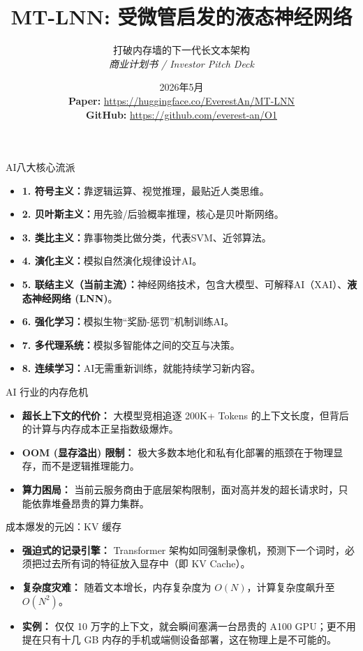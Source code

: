 ﻿\documentclass[aspectratio=169, 10pt]{beamer}
\title{MT-LNN: 受微管启发的液态神经网络}
\subtitle{打破内存墙的下一代长文本架构 \\ \textit{商业计划书 / Investor Pitch Deck}}
\author{\Huge \aeonik{Awareness}}
\date{2026年5月 \\[1em]
\footnotesize
\textbf{Paper:} \url{https://huggingface.co/EverestAn/MT-LNN} \\
\textbf{GitHub:} \url{https://github.com/everest-an/O1}
}
\begin{document}
\frame{\titlepage}

\begin{frame}{AI八大核心流派}
\begin{itemize}
    \item \textbf{1. 符号主义：}靠逻辑运算、视觉推理，最贴近人类思维。
    \item \textbf{2. 贝叶斯主义：}用先验/后验概率推理，核心是贝叶斯网络。
    \item \textbf{3. 类比主义：}靠事物类比做分类，代表SVM、近邻算法。
    \item \textbf{4. 演化主义：}模拟自然演化规律设计AI。
    \item \textbf{5. 联结主义（当前主流）：}神经网络技术，包含大模型、可解释AI（XAI）、\textbf{液态神经网络 (LNN)}。
    \item \textbf{6. 强化学习：}模拟生物“奖励-惩罚”机制训练AI。
    \item \textbf{7. 多代理系统：}模拟多智能体之间的交互与决策。
    \item \textbf{8. 连续学习：}AI无需重新训练，就能持续学习新内容。
\end{itemize}
\end{frame}

\begin{frame}{AI 行业的内存危机}
\begin{itemize}
    \item \textbf{超长上下文的代价：} 大模型竞相追逐 200K+ Tokens 的上下文长度，但背后的计算与内存成本正呈指数级爆炸。
    \item \textbf{OOM (显存溢出) 限制：} 极大多数本地化和私有化部署的瓶颈在于物理显存，而不是逻辑推理能力。
    \item \textbf{算力困局：} 当前云服务商由于底层架构限制，面对高并发的超长请求时，只能依靠堆叠昂贵的算力集群。
\end{itemize}
\end{frame}

\begin{frame}{成本爆发的元凶：KV 缓存}
\begin{itemize}
    \item \textbf{强迫式的记录引擎：} Transformer 架构如同强制录像机，预测下一个词时，必须把过去所有词的特征放入显存中（即 KV Cache）。
    \item \textbf{复杂度灾难：} 随着文本增长，内存复杂度为 $O(N)$，计算复杂度飙升至 $O(N^2)$。
    \item \textbf{实例：} 仅仅 10 万字的上下文，就会瞬间塞满一台昂贵的 A100 GPU；更不用提在只有十几 GB 内存的手机或端侧设备部署，这在物理上是不可能的。
\end{itemize}
\end{frame}
\end{document}
